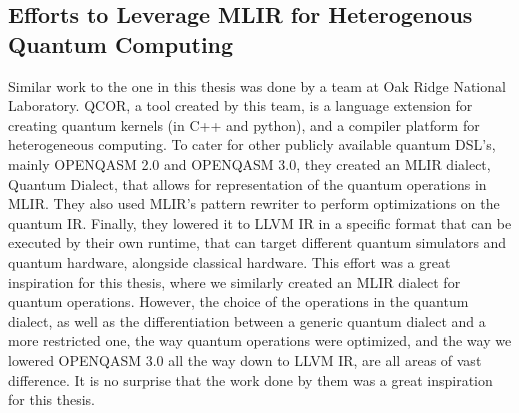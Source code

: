 \subsection{Efforts to Leverage MLIR for Heterogenous Quantum Computing}
Similar work to the one in this thesis was done by a team at Oak Ridge National Laboratory.
QCOR, a tool created by this team, is a language extension for creating quantum kernels (in C++ and python),
and a compiler platform for heterogeneous computing.
To cater for other publicly available quantum DSL's, mainly OPENQASM 2.0 and OPENQASM 3.0, they created an 
MLIR dialect, Quantum Dialect, that allows for representation of the quantum operations in MLIR.
They also used MLIR's pattern rewriter to perform optimizations on the quantum IR.
Finally, they lowered it to LLVM IR in a specific format that can be executed by their own runtime, 
that can target different quantum simulators and quantum hardware, alongside classical hardware.
This effort was a great inspiration for this thesis,
where we similarly created an MLIR dialect for quantum operations.
However, the choice of the operations in the quantum dialect, 
as well as the differentiation between a generic quantum dialect and 
a more restricted one, the way quantum operations were optimized,
 and the way we lowered OPENQASM 3.0 all the way down to LLVM IR, are all areas of vast difference.
It is no surprise that the work done by them was a great inspiration for this thesis.